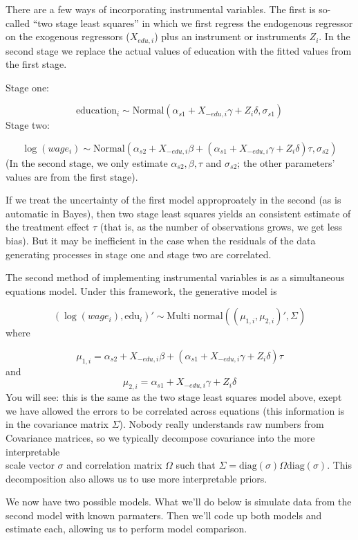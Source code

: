 \documentclass[]{book}
\begin{document}
There are a few ways of incorporating instrumental variables. The first
is so-called ``two stage least squares'' in which we first regress the
endogenous regressor on the exogenous regressors (\(X_{edu,i}\)) plus an
instrument or instruments \(Z_{i}\). In the second stage we replace the
actual values of education with the fitted values from the first stage.

Stage one:

\[
\mbox{education}_{i} \sim \mbox{Normal}(\alpha_{s1} + X_{-edu,i}\gamma + Z_{i}\delta, \sigma_{s1})
\] Stage two:

\[
\log(wage_{i})  \sim \mbox{Normal}(\alpha_{s2} + X_{-edu,i}\beta + (\alpha_{s1} + X_{-edu,i}\gamma + Z_{i}\delta)\tau, \sigma_{s2})
\] (In the second stage, we only estimate \(\alpha_{s2}, \beta, \tau\)
and \(\sigma_{s2}\); the other parameters' values are from the first
stage).

If we treat the uncertainty of the first model approproately in the
second (as is automatic in Bayes), then two stage least squares yields
an consistent estimate of the treatment effect \(\tau\) (that is, as the
number of observations grows, we get less bias). But it may be
inefficient in the case when the residuals of the data generating
processes in stage one and stage two are correlated.

The second method of implementing instrumental variables is as a
simultaneous equations model. Under this framework, the generative model
is

\[
(\log(wage_{i}), \mbox{edu}_{i})' \sim \mbox{Multi normal}\left((\mu_{1,i}, \mu_{2, i})', \Sigma\right)
\] where

\[
\mu_{1,i} = \alpha_{s2} + X_{-edu,i}\beta + (\alpha_{s1} + X_{-edu,i}\gamma + Z_{i}\delta)\tau
\] and \[
\mu_{2,i} = \alpha_{s1} + X_{-edu,i}\gamma + Z_{i}\delta
\] You will see: this is the same as the two stage least squares model
above, exept we have allowed the errors to be correlated across
equations (this information is in the covariance matrix \(\Sigma\)).
Nobody really understands raw numbers from Covariance matrices, so we
typically decompose covariance into the more interpretable\\
scale vector \(\sigma\) and correlation matrix \(\Omega\) such that
\(\Sigma = \mbox{diag}(\sigma)\Omega \mbox{diag}(\sigma)\). This
decomposition also allows us to use more interpretable priors.

We now have two possible models. What we'll do below is simulate data
from the second model with known parmaters. Then we'll code up both
models and estimate each, allowing us to perform model comparison.
\end{document}
